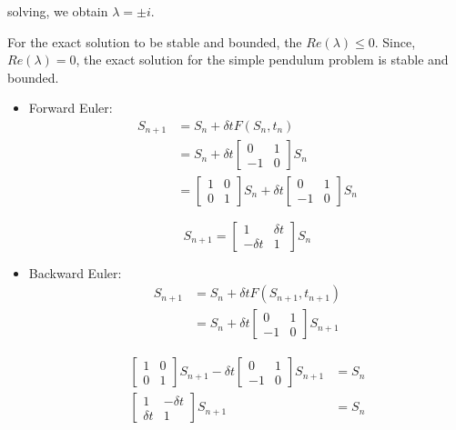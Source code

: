 \documentclass[a4paper,11pt]{report}
\begin{document}
\begin{enumerate}
    solving, we obtain $\lambda = \pm i$.

    For the exact solution to be stable and bounded, the $Re(\lambda) \le 0$. 
    Since, $Re(\lambda) = 0$, the exact solution for the simple pendulum problem
    is stable and bounded.

    \begin{itemize}
    \item Forward Euler:
    \begin{equation*}
    \begin{aligned}
    S_{n+1} &= S_{n} + \delta t F(S_{n}, t_{n}) \\
            &= S_{n} + \delta t \begin{bmatrix} 0 & 1 \\ -1 & 0 \end{bmatrix} S_{n} \\
            &= \begin{bmatrix} 1 & 0 \\ 0 & 1 \end{bmatrix} S_{n} + \delta t \begin{bmatrix} 0 & 1 \\ -1 & 0 \end{bmatrix} S_{n}
    \end{aligned}
    \end{equation*} 

    \begin{equation*}
    S_{n+1} = \begin{bmatrix} 1 & \delta t \\ -\delta t & 1 \end{bmatrix} S_{n}
    \end{equation*}

    \item Backward Euler:
    \begin{equation*}
    \begin{aligned}
    S_{n+1} &= S_{n} + \delta t F(S_{n+1}, t_{n+1}) \\
            &= S_{n} + \delta t \begin{bmatrix} 0 & 1 \\ -1 & 0 \end{bmatrix} S_{n+1}
    \end{aligned}
    \end{equation*}

    \begin{equation*}
    \begin{aligned}
    \begin{bmatrix} 1 & 0 \\ 0 & 1 \end{bmatrix} S_{n+1} - \delta t \begin{bmatrix} 0 & 1 \\ -1 & 0 \end{bmatrix} S_{n+1} &= S_{n} \\
    \begin{bmatrix} 1 & -\delta t \\ \delta t & 1 \end{bmatrix} S_{n+1} &= S_{n}
    \end{aligned} 
    \end{equation*}


\end{itemize}
\end{enumerate}
\end{document}
